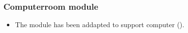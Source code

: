 %
%

%



\subsubsection{Computerroom module}
\begin{itemize}
\item The  module has been addapted to support  computer ().
\end{itemize}



